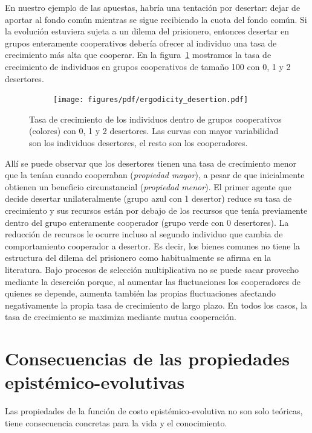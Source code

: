 \documentclass[a4paper,11pt]{book}
\theoremstyle{definition}
\begin{document}
En nuestro ejemplo de las apuestas, habr\'ia una tentaci\'on por desertar: dejar de aportar al fondo com\'un mientras se sigue recibiendo la cuota del fondo com\'un.
%
Si la evoluci\'on estuviera sujeta a un dilema del prisionero, entonces desertar en grupos enteramente cooperativos deber\'ia ofrecer al individuo una tasa de crecimiento m\'as alta que cooperar.
%
En la figura~\ref{fig:desert} mostramos la tasa de crecimiento de individuos en grupos cooperativos de tama\~no 100 con 0, 1 y 2 desertores.
%
\begin{figure}[ht!]
\centering
 \begin{subfigure}[c]{0.45\textwidth} \centering
  \texttt{[image: figures/pdf/ergodicity\_desertion.pdf]}
  \end{subfigure}
 \caption{
Tasa de crecimiento de los individuos dentro de grupos cooperativos (colores) con 0, 1 y 2 desertores. Las curvas con mayor variabilidad son los individuos desertores, el resto son los cooperadores.}
 \label{fig:desert}
 \end{figure}
All\'i se puede observar que los desertores tienen una tasa de crecimiento menor que la ten\'ian cuando cooperaban (\emph{propiedad mayor}), a pesar de que inicialmente obtienen un beneficio circunstancial (\emph{propiedad menor}).
%
El primer agente que decide desertar unilateralmente (grupo azul con 1 desertor) reduce su tasa de crecimiento y sus recursos est\'an por debajo de los recursos que ten\'ia previamente dentro del grupo enteramente cooperador (grupo verde con 0 desertores).
%
La reducci\'on de recursos le ocurre incluso al segundo individuo que cambia de comportamiento cooperador a desertor.
%
Es decir, los bienes comunes no tiene la estructura del dilema del prisionero como habitualmente se afirma en la literatura.
%
Bajo procesos de selecci\'on multiplicativa no se puede sacar provecho mediante la deserci\'on porque, al aumentar las fluctuaciones los cooperadores de quienes se depende, aumenta tambi\'en las propias fluctuaciones afectando negativamente la propia tasa de crecimiento de largo plazo.
%
En todos los casos, la tasa de crecimiento se maximiza mediante mutua cooperaci\'on.


\section{Consecuencias de las propiedades epist\'emico-evolutivas}

Las propiedades de la funci\'on de costo epist\'emico-evolutiva no son solo te\'oricas, tiene consecuencia concretas para la vida y el conocimiento.
\end{document}
